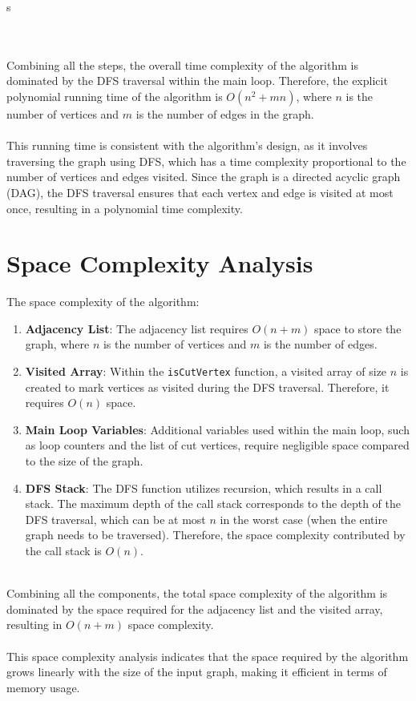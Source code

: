 s\documentclass{article}
\begin{document}
\\ \\
Combining all the steps, the overall time complexity of the algorithm is dominated by the DFS traversal within the main loop. Therefore, the explicit polynomial running time of the algorithm is \( O(n^2 + mn) \), where \( n \) is the number of vertices and \( m \) is the number of edges in the graph.
\\ \\
This running time is consistent with the algorithm's design, as it involves traversing the graph using DFS, which has a time complexity proportional to the number of vertices and edges visited. Since the graph is a directed acyclic graph (DAG), the DFS traversal ensures that each vertex and edge is visited at most once, resulting in a polynomial time complexity.


\section*{Space Complexity Analysis}

The space complexity of the algorithm:

\begin{enumerate}
    \item \textbf{Adjacency List}: The adjacency list requires \( O(n + m) \) space to store the graph, where \( n \) is the number of vertices and \( m \) is the number of edges.
    
    \item \textbf{Visited Array}: Within the \texttt{isCutVertex} function, a visited array of size \( n \) is created to mark vertices as visited during the DFS traversal. Therefore, it requires \( O(n) \) space.
    
    \item \textbf{Main Loop Variables}: Additional variables used within the main loop, such as loop counters and the list of cut vertices, require negligible space compared to the size of the graph.
    
    \item \textbf{DFS Stack}: The DFS function utilizes recursion, which results in a call stack. The maximum depth of the call stack corresponds to the depth of the DFS traversal, which can be at most \( n \) in the worst case (when the entire graph needs to be traversed). Therefore, the space complexity contributed by the call stack is \( O(n) \).
\end{enumerate}
\\
Combining all the components, the total space complexity of the algorithm is dominated by the space required for the adjacency list and the visited array, resulting in \( O(n + m) \) space complexity.
\\ \\
This space complexity analysis indicates that the space required by the algorithm grows linearly with the size of the input graph, making it efficient in terms of memory usage. 
\end{document}
